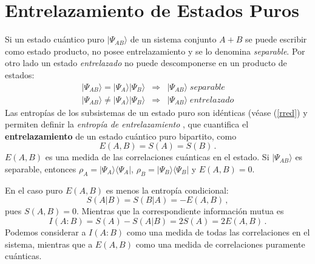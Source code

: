 \section{Entrelazamiento de Estados Puros}
Si un estado cuántico puro $|\Psi_{AB}\rangle$ de un sistema conjunto $A+B$ se puede escribir como
estado producto, no posee entrelazamiento y se lo denomina  {\it separable}. Por otro lado un estado {\it entrelazado} no puede descomponerse en un producto de estados: 
\begin{eqnarray}|\Psi_{AB}\rangle=|\Psi_A\rangle|\Psi_B\rangle&\Rightarrow&|\Psi_{AB}\rangle\;separable\\
 |\Psi_{AB}\rangle\neq |\Psi_A\rangle|\Psi_B\rangle&\Rightarrow&|\Psi_{AB}\rangle\; entrelazado
 \label{QE1}\end{eqnarray}
Las entropías de los subsistemas de un estado puro son idénticas (v\'ease (\ref{rred}) y permiten definir la {\it entropía de entrelazamiento} \cite{NC.00,Sch1},  que cuantifica el {\bf entrelazamiento} de un estado cuántico puro bipartito, como 
\begin{equation}E(A,B)=S(A)=S(B)\,.\label{EAB}\end{equation}
$E(A,B)$ es una medida de las correlaciones
cuánticas en el estado. Si $|\Psi_{AB}\rangle$ es separable, entonces $\rho_A=|\Psi_A\rangle\langle
\Psi_A|$, $\rho_B=|\Psi_B\rangle\langle\Psi_B|$ y $E(A,B)=0$.

En el caso puro $E(A,B)$ es menos la entropía condicional:
\begin{equation}S(A|B)=S(B|A)=-E(A,B)\,,\end{equation}
pues $S(A,B)=0$. Mientras que la correspondiente información mutua es
\begin{equation}I(A:B)=S(A)-S(A|B)=2S(A)=2E(A,B)\,.\end{equation}
Podemos considerar a $I(A:B)$ como una medida de todas las correlaciones
en el sistema, mientras que a $E(A,B)$ como una medida de correlaciones
puramente cuánticas.


